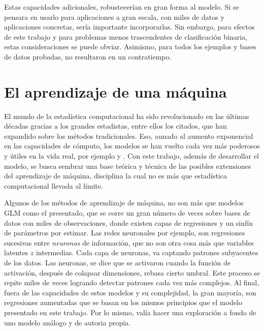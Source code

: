 \documentclass[../Main/Main.tex]{subfiles}
\begin{document}
Estas capacidades adicionales, robustecerían en gran forma al modelo. Si se pensara en usarlo para aplicaciones a gran escala, con miles de datos y aplicaciones concretas, sería importante incorporarlas. Sin embargo, para efectos de este trabajo y para problemas menos trascendentes de clasificación binaria, estas consideraciones se puede obviar. Asimismo, para todos los ejemplos y bases de datos probadas, no resultaron en un contratiempo.

\section{El aprendizaje de una máquina}

El mundo de la estadística computacional ha sido revolucionado en las últimas décadas gracias a los grandes estadistas, entre ellos los citados, que han expandido sobre los métodos tradicionales. Eso, aunado al aumento exponencial en las capacidades de cómputo, los modelos se han vuelto cada vez más poderosos y útiles en la vida real, por ejemplo \citet{madan2015automated} y \citet{shah2014bayesian}. Con este trabajo, además de desarrollar el modelo, se busca sembrar una base teórica y técnica de las posibles extensiones del aprendizaje de máquina, disciplina la cual no es más que estadística computacional llevada al límite.

Algunos de los métodos de aprendizaje de máquina, no son más que modelos GLM como el presentado, que se corre un gran número de veces sobre bases de datos con miles de observaciones, donde existen capas de regresiones y un sinfín de parámetros por estimar. Las redes neuronales por ejemplo, son regresiones sucesivas entre \textit{neuronas} de información, que no son otra cosa más que variables latentes $z$ intermedias. Cada capa de neuronas, va captando patrones subyacentes de los datos. Las neuronas, se dice que se activaron cuando la función de activación, después de colapsar dimensiones, rebasa cierto umbral. Este proceso se repite miles de veces logrando detectar patrones cada vez más complejos. Al final, fuera de las capacidades de estos modelos y su complejidad, la gran mayoría, son regresiones aumentadas que se basan en los mismos principios que el modelo presentado en este trabajo. Por lo mismo, valía hacer una exploración a fondo de uno modelo análogo y de autoria propia. 
\end{document}
